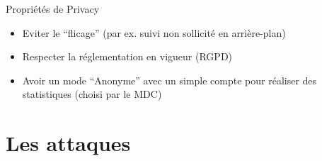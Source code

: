 \documentclass{beamer}
\begin{document}
\begin{frame}{Propriétés de Privacy}
    \begin{itemize}
        \item Eviter le “flicage” (par ex. suivi non sollicité en arrière-plan)\pause
        \item Respecter la réglementation en vigueur (RGPD)\pause
        \item Avoir un mode “Anonyme” avec un simple compte pour réaliser des statistiques (choisi par le MDC)
    \end{itemize}
\end{frame}


\section{Les attaques}
\end{document}
